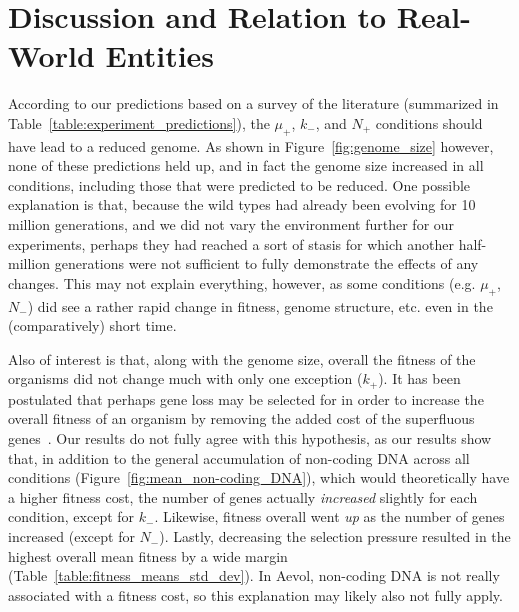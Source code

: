 \section{Discussion and Relation to Real-World Entities}\label{discussion}
According to our predictions based on a survey of the literature (summarized in Table~\ref{table:experiment_predictions}), the $\mu_+$, $k_-$, and $N_+$ conditions should have lead to a reduced genome. As shown in Figure~\ref{fig:genome_size} however, none of these predictions held up, and in fact the genome size increased in all conditions, including those that were predicted to be reduced. One possible explanation is that, because the wild types had already been evolving for 10 million generations, and we did not vary the environment further for our experiments, perhaps they had reached a sort of stasis for which another half-million generations were not sufficient to fully demonstrate the effects of any changes. This may not explain everything, however, as some conditions (e.g. $\mu_+$, $N_-$) did see a rather rapid change in fitness, genome structure, etc. even in the (comparatively) short time. 

Also of interest is that, along with the genome size, overall the fitness of the organisms did not change much with only one exception ($k_+$). It has been postulated that perhaps gene loss may be selected for in order to increase the overall fitness of an organism by removing the added cost of the superfluous genes~\cite{koskiniemi2012}. Our results do not fully agree with this hypothesis, as our results show that, in addition to the general accumulation of non-coding DNA across all conditions (Figure~\ref{fig:mean_non-coding_DNA}), which would theoretically have a higher fitness cost, the number of genes actually \textit{increased} slightly for each condition, except for $k_-$. Likewise, fitness overall went \textit{up} as the number of genes increased (except for $N_-$). Lastly, decreasing the selection pressure resulted in the highest overall mean fitness by a wide margin (Table~\ref{table:fitness_means_std_dev}). In Aevol, non-coding DNA is not really associated with a fitness cost, so this explanation may likely also not fully apply. 


